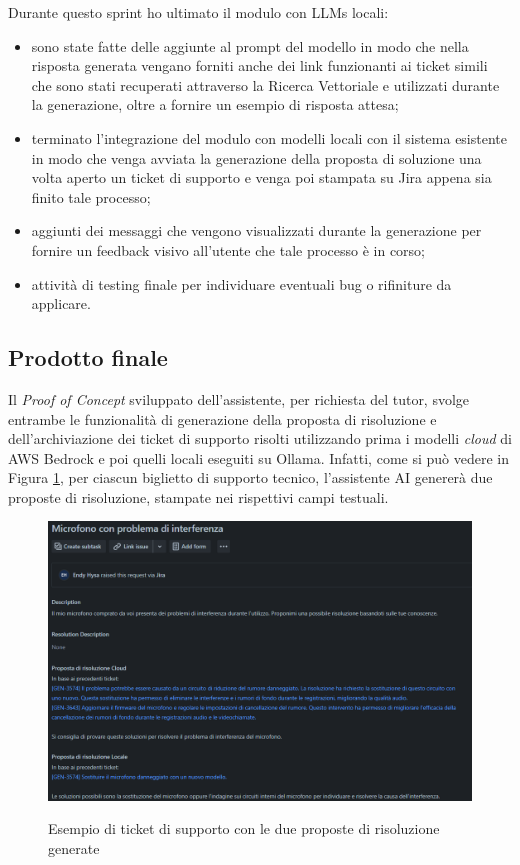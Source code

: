 Durante questo sprint ho ultimato il modulo con LLMs locali:
\begin{itemize}
    \item sono state fatte delle aggiunte al prompt del modello in modo che nella risposta generata vengano forniti anche dei link funzionanti ai ticket simili che sono stati recuperati attraverso la Ricerca Vettoriale e utilizzati durante la generazione, oltre a fornire un esempio di risposta attesa;
    \item terminato l'integrazione del modulo con modelli locali con il sistema esistente in modo che venga avviata la generazione della proposta di soluzione una volta aperto un ticket di supporto e venga poi stampata su Jira appena sia finito tale processo;
    \item aggiunti dei messaggi che vengono visualizzati durante la generazione per fornire un feedback visivo all'utente che tale processo è in corso;
    \item attività di testing finale per individuare eventuali bug o rifiniture da applicare.
\end{itemize}

\newpage
\subsection{Prodotto finale}

Il \textit{Proof of Concept} sviluppato dell'assistente, per richiesta del tutor, svolge entrambe le funzionalità di generazione della proposta di risoluzione e dell'archiviazione dei ticket di supporto risolti utilizzando prima i modelli \textit{cloud} di AWS Bedrock e poi quelli locali eseguiti su Ollama.
Infatti, come si può vedere in Figura \ref{fig:responses_example}, per ciascun biglietto di supporto tecnico, l'assistente AI genererà due proposte di risoluzione, stampate nei rispettivi campi testuali.

\begin{figure}[H]
    \centering
    \includegraphics[alt={Esempio di ticket di supporto con le due proposte di risoluzione generate}, width=1\columnwidth]{img/responseGenerated.png}
    \caption{Esempio di ticket di supporto con le due proposte di risoluzione generate}
    \label{fig:responses_example}
\end{figure}

